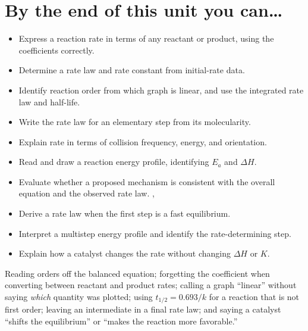 \documentclass{apchem-worksheet}
\begin{document}
\vspace{0.5em}
\section*{\sffamily By the end of this unit you can\ldots}

\begin{itemize}[leftmargin=*,itemsep=0.12em]
  \item Express a reaction rate in terms of any reactant or product, using
        the coefficients correctly. 
  \item Determine a rate law and rate constant from initial-rate data.
  \item Identify reaction order from which graph is linear, and use the
        integrated rate law and half-life. 
  \item Write the rate law for an elementary step from its molecularity.
  \item Explain rate in terms of collision frequency, energy, and
        orientation. 
  \item Read and draw a reaction energy profile, identifying $E_a$ and
        $\Delta H$. 
  \item Evaluate whether a proposed mechanism is consistent with the
        overall equation and the observed rate law. , 
  \item Derive a rate law when the first step is a fast equilibrium.
  \item Interpret a multistep energy profile and identify the
        rate-determining step. 
  \item Explain how a catalyst changes the rate without changing $\Delta H$
        or $K$. 
\end{itemize}

\begin{apctrap}
Reading orders off the balanced equation; forgetting the coefficient when
converting between reactant and product rates; calling a graph ``linear''
without saying \emph{which} quantity was plotted; using $t_{1/2} = 0.693/k$
for a reaction that is not first order; leaving an intermediate in a final
rate law; and saying a catalyst ``shifts the equilibrium'' or ``makes the
reaction more favorable.''
\end{apctrap}
\end{document}

